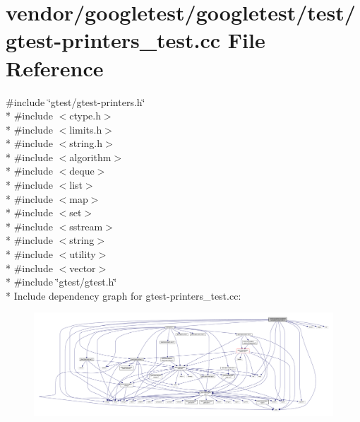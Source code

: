 \hypertarget{gtest-printers__test_8cc}{}\section{vendor/googletest/googletest/test/gtest-\/printers\+\_\+test.cc File Reference}
\label{gtest-printers__test_8cc}
{\ttfamily \#include \char`\"{}gtest/gtest-\/printers.\+h\char`\"{}}\\*
{\ttfamily \#include $<$ctype.\+h$>$}\\*
{\ttfamily \#include $<$limits.\+h$>$}\\*
{\ttfamily \#include $<$string.\+h$>$}\\*
{\ttfamily \#include $<$algorithm$>$}\\*
{\ttfamily \#include $<$deque$>$}\\*
{\ttfamily \#include $<$list$>$}\\*
{\ttfamily \#include $<$map$>$}\\*
{\ttfamily \#include $<$set$>$}\\*
{\ttfamily \#include $<$sstream$>$}\\*
{\ttfamily \#include $<$string$>$}\\*
{\ttfamily \#include $<$utility$>$}\\*
{\ttfamily \#include $<$vector$>$}\\*
{\ttfamily \#include \char`\"{}gtest/gtest.\+h\char`\"{}}\\*
Include dependency graph for gtest-\/printers\+\_\+test.cc\+:
\nopagebreak
\begin{figure}[H]
\begin{center}
\leavevmode
\includegraphics[width=350pt]{gtest-printers__test_8cc__incl}
\end{center}
\end{figure}
